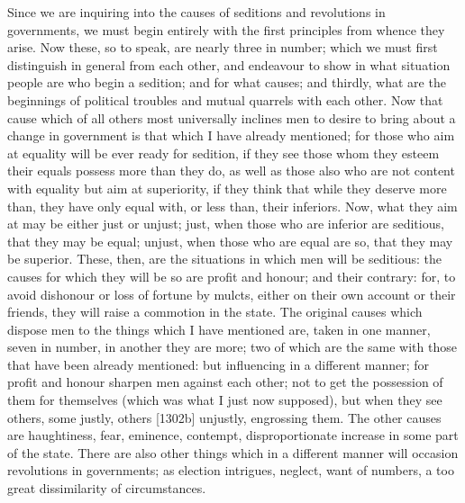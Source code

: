 
Since we are inquiring into the causes of seditions and revolutions in
governments, we must begin entirely with the first principles from whence
they arise. Now these, so to speak, are nearly three in number; which we
must first distinguish in general from each other, and endeavour to show
in what situation people are who begin a sedition; and for what causes;
and thirdly, what are the beginnings of political troubles and mutual
quarrels with each other. Now that cause which of all others most
universally inclines men to desire to bring about a change in government
is that which I have already mentioned; for those who aim at equality will
be ever ready for sedition, if they see those whom they esteem their
equals possess more than they do, as well as those also who are not
content with equality but aim at superiority, if they think that while
they deserve more than, they have only equal with, or less than, their
inferiors. Now, what they aim at may be either just or unjust; just, when
those who are inferior are seditious, that they may be equal; unjust, when
those who are equal are so, that they may be superior. These, then, are
the situations in which men will be seditious: the causes for which they
will be so are profit and honour; and their contrary: for, to avoid
dishonour or loss of fortune by mulcts, either on their own account or
their friends, they will raise a commotion in the state. The original
causes which dispose men to the things which I have mentioned are, taken
in one manner, seven in number, in another they are more; two of which are
the same with those that have been already mentioned: but influencing in a
different manner; for profit and honour sharpen men against each other;
not to get the possession of them for themselves (which was what I just
now supposed), but when they see others, some justly, others [1302b]
unjustly, engrossing them. The other causes are haughtiness, fear,
eminence, contempt, disproportionate increase in some part of the state.
There are also other things which in a different manner will occasion
revolutions in governments; as election intrigues, neglect, want of
numbers, a too great dissimilarity of circumstances.


